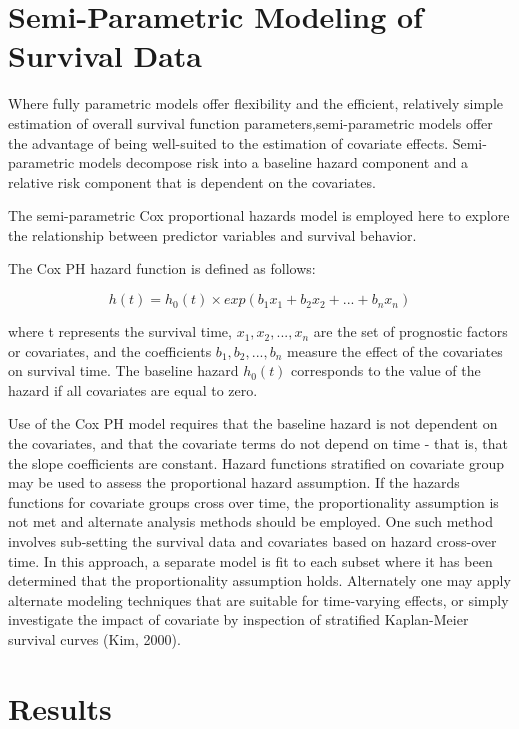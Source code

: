 \documentclass[
]{article}
\begin{document}
\hypertarget{semi-parametric-modeling-of-survival-data}{%
\section{Semi-Parametric Modeling of Survival
Data}\label{semi-parametric-modeling-of-survival-data}}

Where fully parametric models offer flexibility and the efficient,
relatively simple estimation of overall survival function
parameters,semi-parametric models offer the advantage of being
well-suited to the estimation of covariate effects. Semi-parametric
models decompose risk into a baseline hazard component and a relative
risk component that is dependent on the covariates.

The semi-parametric Cox proportional hazards model is employed here to
explore the relationship between predictor variables and survival
behavior.

The Cox PH hazard function is defined as follows:

\[ h(t)=h_0(t)×exp(b_1x_1+b_2x_2+...+b_nx_n) \]

where t represents the survival time, \(x_1,x_2,...,x_n\) are the set of
prognostic factors or covariates, and the coefficients
\(b_1,b_2,...,b_n\) measure the effect of the covariates on survival
time. The baseline hazard \(h_0(t)\) corresponds to the value of the
hazard if all covariates are equal to zero.

Use of the Cox PH model requires that the baseline hazard is not
dependent on the covariates, and that the covariate terms do not depend
on time - that is, that the slope coefficients are constant. Hazard
functions stratified on covariate group may be used to assess the
proportional hazard assumption. If the hazards functions for covariate
groups cross over time, the proportionality assumption is not met and
alternate analysis methods should be employed. One such method involves
sub-setting the survival data and covariates based on hazard cross-over
time. In this approach, a separate model is fit to each subset where it
has been determined that the proportionality assumption holds.
Alternately one may apply alternate modeling techniques that are
suitable for time-varying effects, or simply investigate the impact of
covariate by inspection of stratified Kaplan-Meier survival curves (Kim,
2000).

\hypertarget{results}{%
\section{Results}\label{results}}
\end{document}
